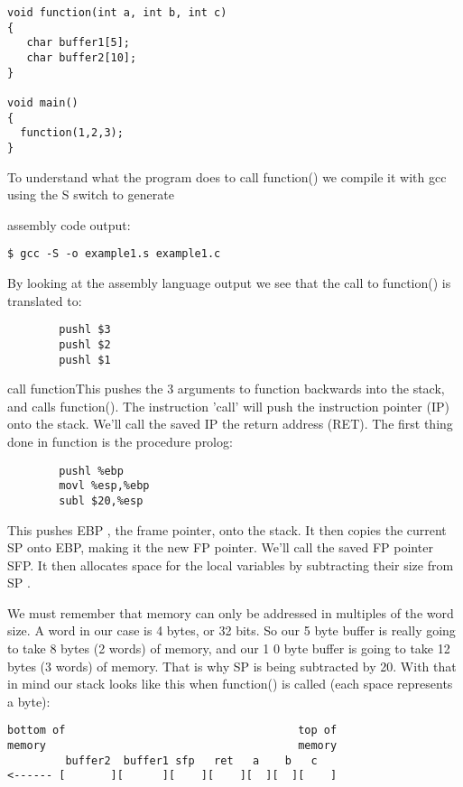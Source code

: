 \documentclass[10pt]{article}
\begin{document}
\begin{CJK}{UTF8}{bsmi}
\begin{lstlisting}[caption=example1.c]
void function(int a, int b, int c) 
{
   char buffer1[5];
   char buffer2[10];
}

void main() 
{
  function(1,2,3);
}
\end{lstlisting}

To understand what the program does to call function() we compile it with gcc using the  S switch to generate 

assembly code output: 

\begin{verbatim}
$ gcc -S -o example1.s example1.c
\end{verbatim}

By looking at the assembly language output we see that the call to function() is translated to:

\begin{lstlisting}
        pushl $3
        pushl $2
        pushl $1
\end{lstlisting}
call functionThis pushes the 3 arguments to function backwards into the stack, and calls function().
The instruction 'call' will push the instruction pointer (IP) onto the stack.
We'll call the saved IP the return address (RET).  The first thing done in function is the procedure prolog:

\begin{lstlisting}
        pushl %ebp
        movl %esp,%ebp
        subl $20,%esp
\end{lstlisting}

This pushes EBP , the frame pointer, onto the stack.  It then copies the current SP onto EBP, making it the new 
FP pointer.  We'll call the saved FP pointer SFP.  It then allocates space for the local variables by subtracting 
their size from SP .

We must remember that memory can only be addressed in multiples of the word size.   A word in our case is 4 
bytes, or 32 bits.  So our 5 byte buffer is really going to take 8 bytes (2 words) of memory, and our 1 0 byte 
buffer is going to take 12 bytes (3 words) of memory.  That is why SP is being subtracted by 20.  With that in 
mind our stack looks like this when function() is called  (each space represents a byte):

{\small
\begin{verbatim}
bottom of                                    top of
memory                                       memory
         buffer2  buffer1 sfp   ret   a    b   c
<------ [       ][      ][    ][    ][  ][  ][    ]


\end{verbatim}}
\end{CJK}
\end{document}
